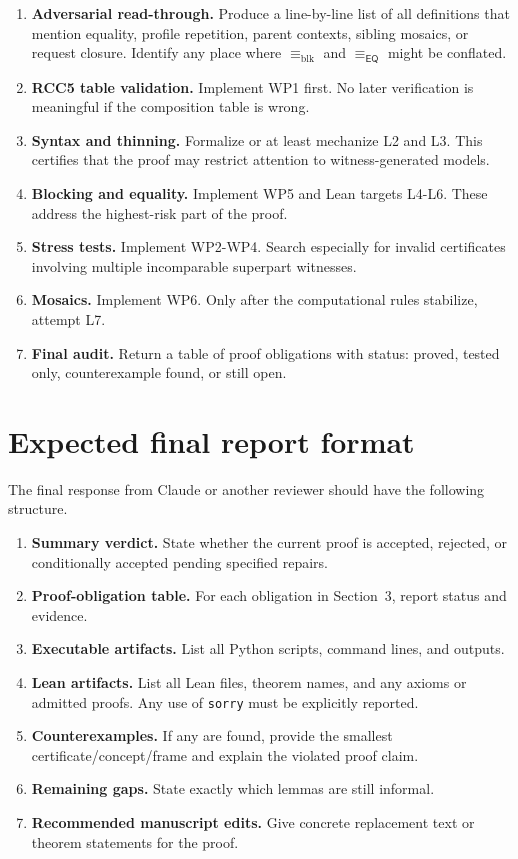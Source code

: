 \documentclass[11pt]{article}
\newcommand{\EQ}{\mathsf{EQ}}
\newcommand{\blk}{\equiv_{\mathrm{blk}}}
\newcommand{\eqrel}{\equiv_{\EQ}}
\theoremstyle{definition}
\theoremstyle{plain}
\begin{document}
\begin{enumerate}[label=Phase \arabic*:, leftmargin=7em]
  \item \textbf{Adversarial read-through.}  Produce a line-by-line list of all definitions that mention equality, profile repetition, parent contexts, sibling mosaics, or request closure.  Identify any place where \(\blk\) and \(\eqrel\) might be conflated.
  \item \textbf{RCC5 table validation.}  Implement WP1 first.  No later verification is meaningful if the composition table is wrong.
  \item \textbf{Syntax and thinning.}  Formalize or at least mechanize L2 and L3.  This certifies that the proof may restrict attention to witness-generated models.
  \item \textbf{Blocking and equality.}  Implement WP5 and Lean targets L4-L6.  These address the highest-risk part of the proof.
  \item \textbf{Stress tests.}  Implement WP2-WP4.  Search especially for invalid certificates involving multiple incomparable superpart witnesses.
  \item \textbf{Mosaics.}  Implement WP6.  Only after the computational rules stabilize, attempt L7.
  \item \textbf{Final audit.}  Return a table of proof obligations with status: proved, tested only, counterexample found, or still open.
\end{enumerate}

\section{Expected final report format}

The final response from Claude or another reviewer should have the following structure.

\begin{enumerate}[label=(\arabic*)]
  \item \textbf{Summary verdict.}  State whether the current proof is accepted, rejected, or conditionally accepted pending specified repairs.
  \item \textbf{Proof-obligation table.}  For each obligation in Section~3, report status and evidence.
  \item \textbf{Executable artifacts.}  List all Python scripts, command lines, and outputs.
  \item \textbf{Lean artifacts.}  List all Lean files, theorem names, and any axioms or admitted proofs.  Any use of \texttt{sorry} must be explicitly reported.
  \item \textbf{Counterexamples.}  If any are found, provide the smallest certificate/concept/frame and explain the violated proof claim.
  \item \textbf{Remaining gaps.}  State exactly which lemmas are still informal.
  \item \textbf{Recommended manuscript edits.}  Give concrete replacement text or theorem statements for the proof.
\end{enumerate}
\end{document}

